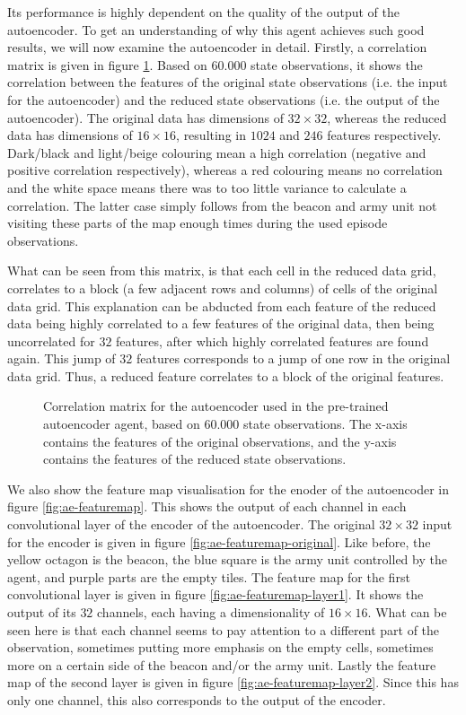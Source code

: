 Its performance is highly dependent on the quality of the output of the autoencoder. To get an understanding of why this agent achieves such good results, we will now examine the autoencoder in detail. Firstly, a correlation matrix is given in figure \ref{fig:ae-corr}. Based on $60.000$ state observations, it shows the correlation between the features of the original state observations (i.e. the input for the autoencoder) and the reduced state observations (i.e. the output of the autoencoder). The original data has dimensions of $32 \times 32$, whereas the reduced data has dimensions of $16 \times 16$, resulting in $1024$ and $246$ features respectively. Dark/black and light/beige colouring mean a high correlation (negative and positive correlation respectively), whereas a red colouring means no correlation and the white space means there was to too little variance to calculate a correlation. The latter case simply follows from the beacon and army unit not visiting these parts of the map enough times during the used episode observations.

What can be seen from this matrix, is that each cell in the reduced data grid, correlates to a block (a few adjacent rows and columns) of cells of the original data grid. This explanation can be abducted from each feature of the reduced data being highly correlated to a few features of the original data, then being uncorrelated for $32$ features, after which highly correlated features are found again. This jump of $32$ features corresponds to a jump of one row in the original data grid. Thus, a reduced feature correlates to a block of the original features.

\begin{figure}
	\centering
	\caption{Correlation matrix for the autoencoder used in the pre-trained autoencoder agent, based on $60.000$ state observations. The x-axis contains the features of the original observations, and the y-axis contains the features of the reduced state observations.}
	\label{fig:ae-corr}
\end{figure}

We also show the feature map visualisation for the enoder of the autoencoder in figure \ref{fig:ae-featuremap}. This shows the output of each channel in each convolutional layer of the encoder of the autoencoder. The original $32 \times 32$ input for the encoder is given in figure \ref{fig:ae-featuremap-original}. Like before, the yellow octagon is the beacon, the blue square is the army unit controlled by the agent, and purple parts are the empty tiles. The feature map for the first convolutional layer is given in figure \ref{fig:ae-featuremap-layer1}. It shows the output of its $32$ channels, each having a dimensionality of $16 \times 16$. What can be seen here is that each channel seems to pay attention to a different part of the observation, sometimes putting more emphasis on the empty cells, sometimes more on a certain side of the beacon and/or the army unit. Lastly the feature map of the second layer is given in figure \ref{fig:ae-featuremap-layer2}. Since this has only one channel, this also corresponds to the output of the encoder. 


